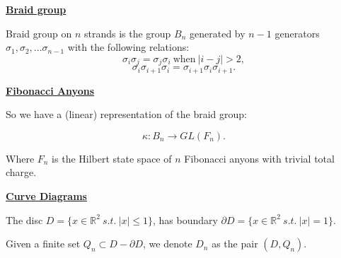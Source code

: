 \documentclass[12pt,a4paper]{article}
\begin{document}
\maketitle

\def\Complex {C}
\def\tensor{\otimes}
\def\Tensor{\bigotimes}
\def\bra #1{\langle #1|}
\def\ket #1{|#1\rangle}
\def\braket #1#2{\langle #1|#2 \rangle}



\def\mathZ{\mathbb{Z}}
\def\mathR{\mathbb{R}}


\def\heading #1{\vskip 20pt \noindent\underline{\large \bf #1}\vskip 5pt}

\def\important #1{\underline{\bf #1}}

%

\heading{Braid group}

Braid group on $n$ strands is the group $B_n$ generated by $n-1$ generators
$\sigma_1, \sigma_2, ... \sigma_{n-1}$ with the following relations:
    $$ \sigma_i \sigma_j = \sigma_j \sigma_i \ \text{when}\ |i-j| > 2, $$
    $$ \sigma_i \sigma_{i+1} \sigma_i =  \sigma_{i+1} \sigma_i \sigma_{i+1}.$$



\heading{Fibonacci Anyons}


So we have a (linear) representation of the braid group:

    $$ \kappa : B_n \to GL(F_n).$$

Where $F_n$ is the Hilbert state space of $n$ Fibonacci anyons with
trivial total charge.



\heading{Curve Diagrams}

The disc $D = \{ x\in \mathR^2\ s.t.\ |x|\leq 1 \} $,
has boundary $\partial D = \{ x\in \mathR^2\ s.t.\ |x|=1 \} $.

Given a finite set $ Q_n \subset D-\partial D$,
we denote $D_n$ as the pair $(D, Q_n).$
\end{document}
